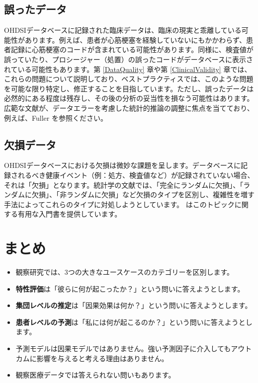 \documentclass[
  11pt]{book}
\makeatletter
\newenvironment{kframe}{%
\medskip{}
\setlength{\fboxsep}{.8em}
 \def\at@end@of@kframe{}%
 \ifinner\ifhmode%
  \def\at@end@of@kframe{\end{minipage}}%
  \begin{minipage}{\columnwidth}%
 \fi\fi%
 \def\FrameCommand##1{\hskip\@totalleftmargin \hskip-\fboxsep
 \colorbox{myShadeColor}{##1}\hskip-\fboxsep
     \hskip-\linewidth \hskip-\@totalleftmargin \hskip\columnwidth}%
 \MakeFramed {\advance\hsize-\width
   \@totalleftmargin\z@ \linewidth\hsize
   \@setminipage}}%
 {\par\unskip\endMakeFramed%
 \at@end@of@kframe}
\newenvironment{rmdblock}[1]
  {
  \begin{itemize}
  \renewcommand{\labelitemi}{
    \raisebox{-.7\height}[0pt][0pt]{
      {\setkeys{Gin}{width=3em,keepaspectratio}\texttt{[image: images/\#1]}}
    }
  }
  \setlength{\fboxsep}{1em}
  \begin{kframe}
  \item
  }
  {
  \end{kframe}
  \end{itemize}
  }
\newenvironment{rmdsummary}
  {\begin{rmdblock}{summary}}
  {\end{rmdblock}}
\theoremstyle{definition}
\theoremstyle{definition}
\theoremstyle{definition}
\theoremstyle{definition}
\theoremstyle{remark}
\makeatother
\begin{document}
\subsection{誤ったデータ}\label{ux8aa4ux3063ux305fux30c7ux30fcux30bf}

OHDSIデータベースに記録された臨床データは、臨床の現実と乖離している可能性があります。例えば、患者が心筋梗塞を経験していないにもかかわらず、患者記録に心筋梗塞のコードが含まれている可能性があります。同様に、検査値が誤っていたり、プロシージャー（処置）の誤ったコードがデータベースに表示されている可能性もあります。第 \ref{DataQuality} 章や第 \ref{ClinicalValidity} 章では、これらの問題について説明しており、ベストプラクティスでは、このような問題を可能な限り特定し、修正することを目指しています。ただし、誤ったデータは必然的にある程度は残存し、その後の分析の妥当性を損なう可能性はあります。広範な文献が、データエラーを考慮した統計的推論の調整に焦点を当てており、例えば、Fuller \citet{fuller2009measurement} を参照ください。

\subsection{欠損データ}\label{ux6b20ux640dux30c7ux30fcux30bf}


OHDSIデータベースにおける欠損は微妙な課題を呈します。データベースに記録されるべき健康イベント（例：処方、検査値など）が記録されていない場合、それは「欠損」となります。統計学の文献では、「完全にランダムに欠損」、「ランダムに欠損」、「非ランダムに欠損」など欠損のタイプを区別し、複雑性を増す手法によってこれらのタイプに対処しようとしています。\citet{perkins2017principled} はこのトピックに関する有用な入門書を提供しています。

\section{まとめ}\label{ux307eux3068ux3081-5}

\begin{rmdsummary}
\begin{itemize}
\item
  観察研究では、3つの大きなユースケースのカテゴリーを区別します。
\item
  \textbf{特性評価}は「彼らに何が起こったか？」という問いに答えようとします。
\item
  \textbf{集団レベルの推定}は「因果効果は何か？」という問いに答えようとします。
\item
  \textbf{患者レベルの予測}は「私には何が起こるのか？」という問いに答えようとします。
\item
  予測モデルは因果モデルではありません。強い予測因子に介入してもアウトカムに影響を与えると考える理由はありません。
\item
  観察医療データでは答えられない問いもあります。
\end{itemize}
\end{rmdsummary}
\end{document}

